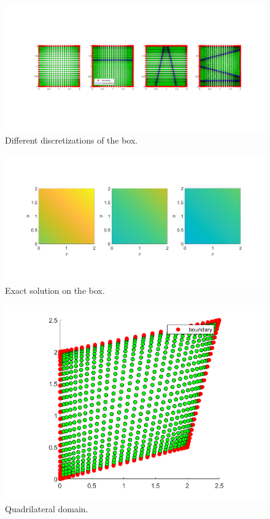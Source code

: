 \documentclass[11pt, a4paper]{article}
\theoremstyle{definition}
\begin{document}
	\begin{figure}[h]
		\centering
		\includegraphics[scale=0.35]{BoxSections.png}
		\caption{Different discretizations of the box.} 
		\label{F2}
	\end{figure}

	\begin{figure}[h]
		\centering
		\includegraphics[scale=0.35]{boxEx.png}
		\caption{Exact solution on the box.} 
		\label{F3}
	\end{figure}
	\begin{figure}[h]
		\centering
		\includegraphics[scale=0.35]{quad.png}
		\caption{Quadrilateral domain.} 
		\label{F3a}
	\end{figure}
\end{document}

